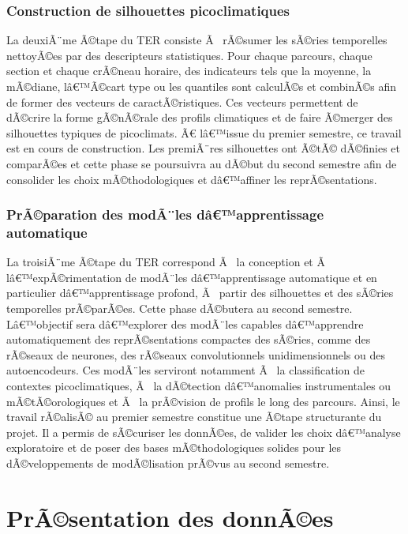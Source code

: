 \documentclass{article}
\begin{document}
\subsubsection{Construction de silhouettes picoclimatiques}

La deuxiÃ¨me Ã©tape du TER consiste Ã  rÃ©sumer les sÃ©ries temporelles nettoyÃ©es par des descripteurs statistiques. Pour chaque parcours, chaque section et chaque crÃ©neau horaire, des indicateurs tels que la moyenne, la mÃ©diane, lâ€™Ã©cart type ou les quantiles sont calculÃ©s et combinÃ©s afin de former des vecteurs de caractÃ©ristiques. Ces vecteurs permettent de dÃ©crire la forme gÃ©nÃ©rale des profils climatiques et de faire Ã©merger des silhouettes typiques de picoclimats. Ã€ lâ€™issue du premier semestre, ce travail est en cours de construction. Les premiÃ¨res silhouettes ont Ã©tÃ© dÃ©finies et comparÃ©es et cette phase se poursuivra au dÃ©but du second semestre afin de consolider les choix mÃ©thodologiques et dâ€™affiner les reprÃ©sentations.

\subsubsection{PrÃ©paration des modÃ¨les dâ€™apprentissage automatique}

La troisiÃ¨me Ã©tape du TER correspond Ã  la conception et Ã  lâ€™expÃ©rimentation de modÃ¨les dâ€™apprentissage automatique et en particulier dâ€™apprentissage profond, Ã  partir des silhouettes et des sÃ©ries temporelles prÃ©parÃ©es. Cette phase dÃ©butera au second semestre. Lâ€™objectif sera dâ€™explorer des modÃ¨les capables dâ€™apprendre automatiquement des reprÃ©sentations compactes des sÃ©ries, comme des rÃ©seaux de neurones, des rÃ©seaux convolutionnels unidimensionnels ou des autoencodeurs. Ces modÃ¨les serviront notamment Ã  la classification de contextes picoclimatiques, Ã  la dÃ©tection dâ€™anomalies instrumentales ou mÃ©tÃ©orologiques et Ã  la prÃ©vision de profils le long des parcours. Ainsi, le travail rÃ©alisÃ© au premier semestre constitue une Ã©tape structurante du projet. Il a permis de sÃ©curiser les donnÃ©es, de valider les choix dâ€™analyse exploratoire et de poser des bases mÃ©thodologiques solides pour les dÃ©veloppements de modÃ©lisation prÃ©vus au second semestre.

\newpage
\section{PrÃ©sentation des donnÃ©es}
\label{sec:donnÃ©es}
\end{document}
